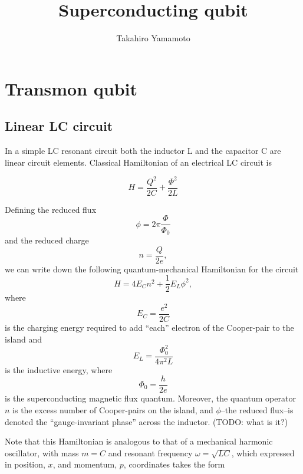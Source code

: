 \documentclass[11pt, oneside]{article}   	%
\title{Superconducting qubit}
\author{Takahiro Yamamoto}
\begin{document}
\maketitle

\section{Transmon qubit}
\subsection{Linear LC circuit}
In a simple LC resonant circuit both the inductor L and the capacitor C are linear circuit elements. 
Classical Hamiltonian of an electrical LC circuit is

\begin{equation*} 
H = \frac{Q^2}{2 C} + \frac{\Phi^2}{2 L}
\end{equation*}

Defining the reduced flux 
\begin{equation*} 
\phi = 2 \pi \frac{\Phi}{\Phi_0}
\end{equation*}
and the reduced charge 
\begin{equation*} 
n = \frac{Q}{2 e},
\end{equation*}
we can write down the following quantum-mechanical Hamiltonian for the circuit
\begin{equation*} 
H = 4 E_C n^2 + \frac{1}{2} E_L \phi^2,
\end{equation*}
where 
\begin{equation*} 
E_C = \frac{e^2}{2 C} 
\end{equation*}
is the charging energy required to add ``each'' electron of the Cooper-pair to the island and 
\begin{equation*} 
E_L = \frac{\Phi^2_0}{4 \pi^2 L} 
\end{equation*}
is the inductive energy, where 
\begin{equation*} 
\Phi_0 = \frac{h}{2e}
\end{equation*}
is the superconducting magnetic flux quantum. 
Moreover, the quantum operator $n$ is the excess number of Cooper-pairs on the island, 
and $\phi$--the reduced flux--is denoted the ``gauge-invariant phase'' across the inductor. 
(TODO: what is it?)

Note that this Hamiltonian is analogous to that of a mechanical harmonic oscillator, with mass 
$m = C$ 
and resonant frequency 
$\omega = \sqrt{LC}$, 
which expressed in position, $x$, and momentum, $p$, coordinates takes the form 
\end{document}
